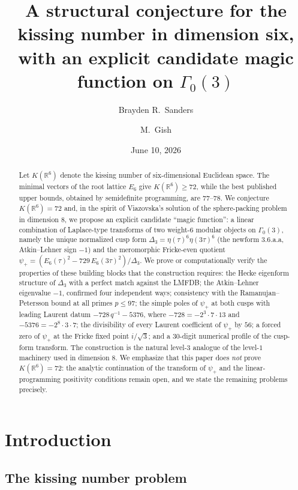 \documentclass[11pt,reqno]{amsart}
\title[A conjecture for the kissing number in dimension six]%
{A structural conjecture for the kissing number in dimension six,
with an explicit candidate magic function on
\texorpdfstring{$\Gamma_0(3)$}{Gamma0(3)}}
\author{Brayden R.\ Sanders}
\author{M.\ Gish}
\date{June 10, 2026}
\theoremstyle{plain}
\theoremstyle{definition}
\theoremstyle{remark}
\newcommand{\R}{\mathbb{R}}
\newcommand{\Dthree}{\Delta_{3}}
\newcommand{\psip}{\psi_{+}}
\begin{document}
\begin{abstract}
Let $K(\R^6)$ denote the kissing number of six-dimensional Euclidean
space.  The minimal vectors of the root lattice $E_6$ give
$K(\R^6)\ge 72$, while the best published upper bounds, obtained by
semidefinite programming, are $77$--$78$.  We conjecture
$K(\R^6)=72$ and, in the spirit of Viazovska's solution of the
sphere-packing problem in dimension $8$, we propose an explicit
candidate ``magic function'': a linear combination of Laplace-type
transforms of two weight-$6$ modular objects on $\Gamma_0(3)$, namely
the unique normalized cusp form
$\Dthree=\eta(\tau)^6\eta(3\tau)^6$ (the newform \textsf{3.6.a.a},
Atkin--Lehner sign $-1$) and the meromorphic Fricke-even quotient
$\psip=(E_6(\tau)^2-729\,E_6(3\tau)^2)/\Dthree$.
We prove or computationally verify the properties of these building
blocks that the construction requires: the Hecke eigenform structure of
$\Dthree$ with a perfect match against the LMFDB; the Atkin--Lehner
eigenvalue $-1$, confirmed four independent ways; consistency with the
Ramanujan--Petersson bound at all primes $p\le 97$; the simple poles of
$\psip$ at both cusps with leading Laurent datum
$-728\,q^{-1}-5376$, where $-728=-2^3\cdot7\cdot13$ and
$-5376=-2^8\cdot3\cdot7$; the divisibility of every Laurent coefficient
of $\psip$ by $56$; a forced zero of $\psip$ at the Fricke fixed point
$i/\sqrt3$; and a $30$-digit numerical profile of the cusp-form
transform.  The construction is the natural level-$3$ analogue of the
level-$1$ machinery used in dimension $8$.  We emphasize that this
paper does \emph{not} prove $K(\R^6)=72$: the analytic continuation of
the transform of $\psip$ and the linear-programming positivity
conditions remain open, and we state the remaining problems precisely.
\end{abstract}

\maketitle

\section{Introduction}\label{sec:intro}

\subsection{The kissing number problem}
\end{document}
